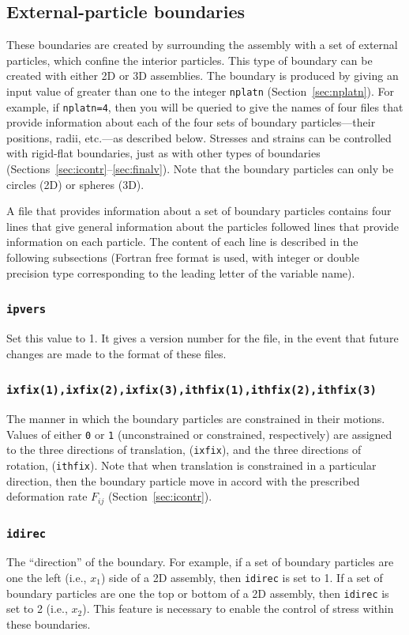 \documentclass[letterpaper,11pt]{article}
\begin{document}
\subsection{External-particle boundaries}\label{sec:ExternalParticles}
These boundaries are created by surrounding the assembly with
a set of external particles, which confine the interior particles.
This type of boundary can be created with either 2D or 3D assemblies.
The boundary is produced by giving an input value of greater than one
to the integer \texttt{nplatn} (Section~\ref{sec:nplatn}).
For example, if \texttt{nplatn=4}, then you will be queried to
give the names of four files that provide information about
each of the four sets of
boundary particles---their positions, radii, etc.---as described below.
Stresses and strains can be controlled with rigid-flat boundaries,
just as with other types of boundaries
(Sections~\ref{sec:icontr}--\ref{sec:finalv}).
Note that the boundary particles can only be circles (2D) or spheres (3D).
\par
A file that provides information about a set of boundary
particles contains four lines that give general information about
the particles followed lines that provide information on each particle.
The content of each line is described in the following
subsections (Fortran free format is used, with integer or double precision
type corresponding to the leading letter of the variable name).
%
\subsubsection[\texttt{ipvers}]{\texttt{ipvers}}%
\label{sec:pb1}
Set this value to 1.  It gives a version number for the file, in the
event that future changes are made to the format of these files.
%
%
\subsubsection[\texttt{ixfix(1)}]{\texttt{ixfix(1),ixfix(2),ixfix(3),ithfix(1),ithfix(2),ithfix(3)}}%
\label{sec:pb2}
The manner in which the boundary particles are constrained in their motions.
Values of either \texttt{0} or \texttt{1} (unconstrained or constrained,
respectively) are assigned to the three directions of translation,
(\texttt{ixfix}), and the three directions of rotation, (\texttt{ithfix}).
Note that when translation is constrained in a particular direction, then
the boundary particle move in accord with the prescribed
deformation rate $F_{ij}$ (Section~\ref{sec:icontr}).
%
\subsubsection[\texttt{idirec}]{\texttt{idirec}}%
\label{sec:pb3}
The ``direction'' of the boundary.  For example, if a set of boundary 
particles are one the left (i.e., $x_{1}$) side of a 2D assembly, 
then \texttt{idirec} is set to 1.  If a set of boundary
particles are one the top or bottom of a 2D assembly, 
then \texttt{idirec} is set to 2 (i.e., $x_{2}$).
This feature is necessary to enable the control of stress within these
boundaries.
%
\end{document}
